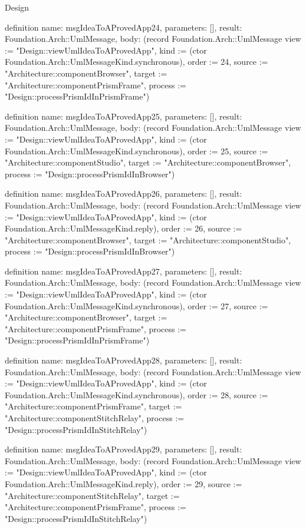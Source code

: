 \begin{lexlean}{Design}
\begin{semanticmodule}
definition{
  name: msgIdeaToAProvedApp24,
  parameters: [],
  result: Foundation.Arch::UmlMessage,
  body: (record Foundation.Arch::UmlMessage {view := "Design::viewUmlIdeaToAProvedApp", kind := (ctor Foundation.Arch::UmlMessageKind.synchronous), order := 24, source := "Architecture::componentBrowser", target := "Architecture::componentPrismFrame", process := "Design::processPrismIdInPrismFrame"})
}

definition{
  name: msgIdeaToAProvedApp25,
  parameters: [],
  result: Foundation.Arch::UmlMessage,
  body: (record Foundation.Arch::UmlMessage {view := "Design::viewUmlIdeaToAProvedApp", kind := (ctor Foundation.Arch::UmlMessageKind.synchronous), order := 25, source := "Architecture::componentStudio", target := "Architecture::componentBrowser", process := "Design::processPrismIdInBrowser"})
}

definition{
  name: msgIdeaToAProvedApp26,
  parameters: [],
  result: Foundation.Arch::UmlMessage,
  body: (record Foundation.Arch::UmlMessage {view := "Design::viewUmlIdeaToAProvedApp", kind := (ctor Foundation.Arch::UmlMessageKind.reply), order := 26, source := "Architecture::componentBrowser", target := "Architecture::componentStudio", process := "Design::processPrismIdInBrowser"})
}

definition{
  name: msgIdeaToAProvedApp27,
  parameters: [],
  result: Foundation.Arch::UmlMessage,
  body: (record Foundation.Arch::UmlMessage {view := "Design::viewUmlIdeaToAProvedApp", kind := (ctor Foundation.Arch::UmlMessageKind.synchronous), order := 27, source := "Architecture::componentBrowser", target := "Architecture::componentPrismFrame", process := "Design::processPrismIdInPrismFrame"})
}

definition{
  name: msgIdeaToAProvedApp28,
  parameters: [],
  result: Foundation.Arch::UmlMessage,
  body: (record Foundation.Arch::UmlMessage {view := "Design::viewUmlIdeaToAProvedApp", kind := (ctor Foundation.Arch::UmlMessageKind.synchronous), order := 28, source := "Architecture::componentPrismFrame", target := "Architecture::componentStitchRelay", process := "Design::processPrismIdInStitchRelay"})
}

definition{
  name: msgIdeaToAProvedApp29,
  parameters: [],
  result: Foundation.Arch::UmlMessage,
  body: (record Foundation.Arch::UmlMessage {view := "Design::viewUmlIdeaToAProvedApp", kind := (ctor Foundation.Arch::UmlMessageKind.reply), order := 29, source := "Architecture::componentStitchRelay", target := "Architecture::componentPrismFrame", process := "Design::processPrismIdInStitchRelay"})
}


\end{semanticmodule}
\end{lexlean}
